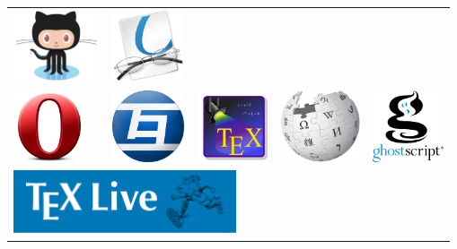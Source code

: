 \begin{tabular}{lllll}
\href{https://github.com/}{\includegraphics[height=80px]{img/thanks/octocat.png}} &
\href{http://okular.kde.org/}{\includegraphics[height=80px]{img/thanks/okular.png}} \\

\href{http://www.opera.com/}{\includegraphics[height=80px]{img/thanks/opera.png}} &
\href{http://www.tagaini.net/}{\includegraphics[height=80px]{img/thanks/tagainijisho.png}} &
\href{http://texstudio.sourceforge.net/}{\includegraphics[height=80px]{img/thanks/texstudio.png}} &
\href{http://www.wikipedia.org/}{\includegraphics[height=80px]{img/thanks/wikipedia.png}} &
\href{http://www.ghostscript.com/}{\includegraphics[height=80px]{img/thanks/ghostscript.png}} \\

\multicolumn{3}{l}{\href{http://www.tug.org/texlive/}{\includegraphics[height=70px]{img/thanks/texlive.png}}} &
&
\\
\end{tabular}

